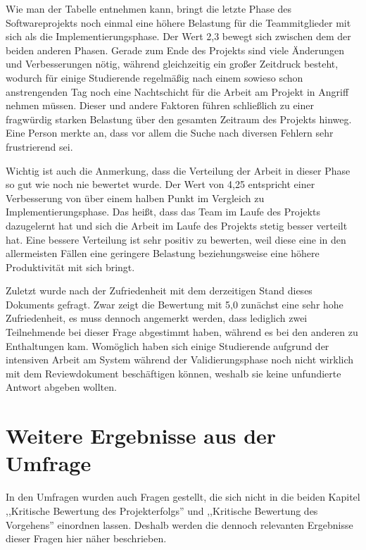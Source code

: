 \documentclass[../review_3.tex]{subfiles}
\begin{document}
Wie man der Tabelle entnehmen kann, bringt die letzte Phase des Softwareprojekts noch einmal eine höhere Belastung für die Teammitglieder mit sich als die Implementierungsphase. Der Wert 2,3 bewegt sich zwischen dem der beiden anderen Phasen. Gerade zum Ende des Projekts sind viele Änderungen und Verbesserungen nötig, während gleichzeitig ein großer Zeitdruck besteht, wodurch für einige Studierende regelmäßig nach einem sowieso schon anstrengenden Tag noch eine Nachtschicht für die Arbeit am Projekt in Angriff nehmen müssen. Dieser und andere Faktoren führen schließlich zu einer fragwürdig starken Belastung über den gesamten Zeitraum des Projekts hinweg. Eine Person merkte an, dass vor allem die Suche nach diversen Fehlern sehr frustrierend sei.

Wichtig ist auch die Anmerkung, dass die Verteilung der Arbeit in dieser Phase so gut wie noch nie bewertet wurde. Der Wert von 4,25 entspricht einer Verbesserung von über einem halben Punkt im Vergleich zu Implementierungsphase. Das heißt, dass das Team im Laufe des Projekts dazugelernt hat und sich die Arbeit im Laufe des Projekts stetig besser verteilt hat. Eine bessere Verteilung ist sehr positiv zu bewerten, weil diese eine in den allermeisten Fällen eine geringere Belastung beziehungsweise eine höhere Produktivität mit sich bringt.

Zuletzt wurde nach der Zufriedenheit mit dem derzeitigen Stand dieses Dokuments gefragt. Zwar zeigt die Bewertung mit 5,0 zunächst eine sehr hohe Zufriedenheit, es muss dennoch angemerkt werden, dass lediglich zwei Teilnehmende bei dieser Frage abgestimmt haben, während es bei den anderen zu Enthaltungen kam. Womöglich haben sich einige Studierende aufgrund der intensiven Arbeit am System während der Validierungsphase noch nicht wirklich mit dem Reviewdokument beschäftigen können, weshalb sie keine unfundierte Antwort abgeben wollten.

\section{Weitere Ergebnisse aus der Umfrage}
In den Umfragen wurden auch Fragen gestellt, die sich nicht in die beiden Kapitel ,,Kritische Bewertung des Projekterfolgs'' und ,,Kritische Bewertung des Vorgehens'' einordnen lassen. Deshalb werden die dennoch relevanten Ergebnisse dieser Fragen hier näher beschrieben.
\end{document}
